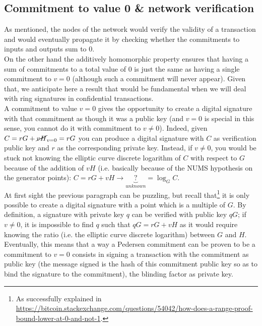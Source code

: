 \subsection{Commitment to value 0 \& network verification}
\label{commitment_to_0}
As mentioned, the nodes of the network would verify the validity of a transaction and would eventually propagate it by checking whether the commitments to inputs and outputs sum to 0.\\
On the other hand the additively homomorphic property ensures that having a sum of commitments to a total value of 0 is just the same as having a single commitment to $v=0$ (although such a commitment will never appear). Given that, we anticipate here a result that would be fundamental when we will deal with ring signatures in confidential transactions.\\
A commitment to value $v = 0$ gives the opportunity to create a digital signature with that commitment as though it was a public key (and $v=0$ is special in this sense, you cannot do it with commitment to $v \neq 0$). Indeed, given $C = rG + \cancel{vH}_{v=0} = rG$ you can produce a digital signature with $C$ as verification public key and $r$ as the corresponding private key. Instead, if $v \neq 0$, you would be stuck not knowing the elliptic curve discrete logarithm of $C$ with respect to $G$ because of the addition of $vH$ (i.e. basically because of the NUMS hypothesis on the generator points): $C = rG + vH \rightarrow \underbrace{?}_{unknown} = \log_GC$.\\
At first sight the previous paragraph can be puzzling, but recall that\footnote{As successfully explained in \url{https://bitcoin.stackexchange.com/questions/54042/how-does-a-range-proof-bound-lower-at-0-and-not-1}.} it is only possible to create a digital signature with a point which is a multiple of $G$. By definition, a signature with private key $q$ can be verified with public key $qG$; if $v \neq 0$, it is impossible to find $q$ such that $qG = rG + vH$ as it would require knowing the ratio (i.e. the elliptic curve discrete logarithm) between $G$ and $H$.\\
Eventually, this means that a way a Pedersen commitment can be proven to be a commitment to $v=0$ consists in signing a transaction with the commitment as public key (the message signed is the hash of this commitment public key so as to bind the signature to the commitment), the blinding factor as private key.

